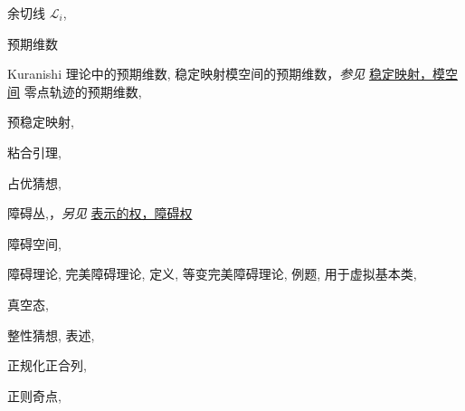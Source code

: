\begin{theindex}
\indexspace
\item \leavevmode\hypertarget{idx:0198}{余切线 $\mathcal L_i$},\enspace{}
\indexspace
\item \leavevmode\hypertarget{idx:0281}{预期维数}
\subitem \leavevmode\hypertarget{idx:0282}{Kuranishi 理论中的预期维数},\enspace{}
\subitem \leavevmode\hypertarget{idx:0283}{稳定映射模空间的预期维数}，\textit{参见} \hyperlink{idx:1276}{稳定映射，模空间}
\subitem \leavevmode\hypertarget{idx:0284}{零点轨迹的预期维数},\enspace{}
\indexspace
\item \leavevmode\hypertarget{idx:1084}{预稳定映射},\enspace{}
\indexspace
\item \leavevmode\hypertarget{idx:0451}{粘合引理},\enspace{}
\indexspace
\item \leavevmode\hypertarget{idx:0217}{占优猜想},\enspace{}
\indexspace
\item \leavevmode\hypertarget{idx:0957}{障碍丛},\enspace{}，\textit{另见} \hyperlink{idx:1435}{表示的权，障碍权}
\indexspace
\item \leavevmode\hypertarget{idx:0958}{障碍空间},\enspace{}
\indexspace
\item \leavevmode\hypertarget{idx:0959}{障碍理论},\enspace{}
\subitem \leavevmode\hypertarget{idx:0960}{完美障碍理论},\enspace{}
\subsubitem \leavevmode\hypertarget{idx:0961}{定义},\enspace{}
\subsubitem \leavevmode\hypertarget{idx:0962}{等变完美障碍理论},\enspace{}
\subsubitem \leavevmode\hypertarget{idx:0963}{例题},\enspace{}
\subsubitem \leavevmode\hypertarget{idx:0964}{用于虚拟基本类},\enspace{}
\indexspace
\item \leavevmode\hypertarget{idx:1385}{真空态},\enspace{}
\indexspace
\item \leavevmode\hypertarget{idx:0636}{整性猜想},\enspace{}
\subitem \leavevmode\hypertarget{idx:0637}{表述},\enspace{}
\indexspace
\item \leavevmode\hypertarget{idx:0952}{正规化正合列},\enspace{}
\indexspace
\item \leavevmode\hypertarget{idx:1225}{正则奇点},\enspace{}

\end{theindex}

